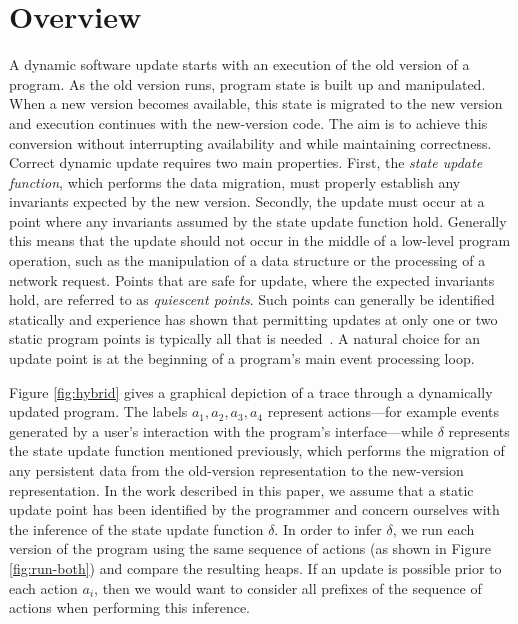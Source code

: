 \section{Overview}

A dynamic software update starts with an execution of the old version
of a program.  As the old version runs, program state is built up and
manipulated.  When a new version becomes available, this state is
migrated to the new version and execution continues with the
new-version code.  The aim is to achieve this conversion without
interrupting availability and while maintaining correctness.  Correct
dynamic update requires two main properties.  First, the \emph{state
  update function}, which performs the data migration, must properly
establish any invariants expected by the new version.  Secondly, the
update must occur at a point where any invariants assumed by the state
update function hold.  Generally this means that the update should not
occur in the middle of a low-level program operation, such as the
manipulation of a data structure or the processing of a network
request.  Points that are safe for update, where the expected
invariants hold, are referred to as \emph{quiescent points}.  Such
points can generally be identified statically and experience has shown
that permitting updates at only one or two static program points is
typically all that is needed~\cite{chris-tr}.  A natural choice for an
update point is at the beginning of a program's main event processing
loop.

Figure \ref{fig:hybrid} gives a graphical depiction of a trace through
a dynamically updated program.  The labels $a_1, a_2, a_3, a_4$
represent actions---for example events generated by a user's
interaction with the program's interface---while $\delta$ represents
the state update function mentioned previously, which performs the
migration of any persistent data from the old-version representation
to the new-version representation.  In the work described in this
paper, we assume that a static update point has been identified by the
programmer and concern ourselves with the inference of the state
update function $\delta$.  In order to infer $\delta$, we run each
version of the program using the same sequence of actions (as shown in
Figure \ref{fig:run-both}) and compare the resulting heaps.  If an
update is possible prior to each action $a_i$, then we would want to
consider all prefixes of the sequence of actions when performing this
inference.

